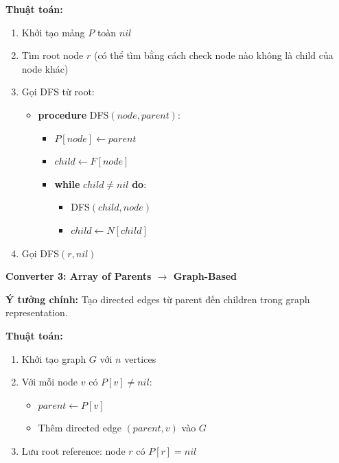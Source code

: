 \documentclass[12pt,a4paper]{article}
\begin{document}
\textbf{Thuật toán:}
\begin{enumerate}
    \item Khởi tạo mảng $P$ toàn $nil$
    \item Tìm root node $r$ (có thể tìm bằng cách check node nào không là child của node khác)
    \item Gọi DFS từ root:
    \begin{itemize}
        \item \textbf{procedure} DFS$(node, parent)$:
        \begin{itemize}
            \item $P[node] \leftarrow parent$
            \item $child \leftarrow F[node]$
            \item \textbf{while} $child \neq nil$ \textbf{do}:
            \begin{itemize}
                \item DFS$(child, node)$
                \item $child \leftarrow N[child]$
            \end{itemize}
        \end{itemize}
    \end{itemize}
    \item Gọi DFS$(r, nil)$
\end{enumerate}


\vspace{0.5cm}

\textbf{Converter 3: Array of Parents $\rightarrow$ Graph-Based}
\vspace{0.5cm}

\textbf{Ý tưởng chính:} Tạo directed edges từ parent đến children trong graph representation.

\textbf{Thuật toán:}
\begin{enumerate}
    \item Khởi tạo graph $G$ với $n$ vertices
    \item Với mỗi node $v$ có $P[v] \neq nil$:
    \begin{itemize}
        \item $parent \leftarrow P[v]$
        \item Thêm directed edge $(parent, v)$ vào $G$
    \end{itemize}
    \item Lưu root reference: node $r$ có $P[r] = nil$
\end{enumerate}


\vspace{0.5cm}
\end{document}
